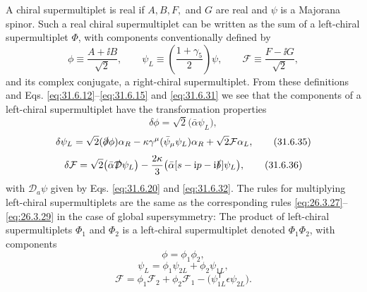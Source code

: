 A chiral supermultiplet is real if \(A,B,F,\) and \(G\) are real and
\(\psi\) is a Majorana spinor. Such a real chiral supermultiplet can be
written as the sum of a left-chiral supermultiplet \(\Phi\), with
components conventionally defined by
\begin{equation}
  \phi\equiv\frac{A+\ii B}{\sqrt{2}},\qquad
  \psi_L\equiv\left(\frac{1+\gamma_5}{2}\right)\psi,\qquad
  \mathcal F\equiv\frac{F-\ii G}{\sqrt{2}},
  \tag{31.6.33}\label{eq:31.6.33}
\end{equation}
and its complex conjugate, a right-chiral supermultiplet. From these
definitions and Eqs. \eqref{eq:31.6.12}--\eqref{eq:31.6.15} and
\eqref{eq:31.6.31} we see that the components of a left-chiral
supermultiplet have the transformation properties
\begin{equation}
  \delta\phi=\sqrt{2}\bigl(\bar\alpha\psi_L\bigr),
  \tag{31.6.34}\label{eq:31.6.34}
\end{equation}
\begin{equation}
  \delta\psi_L
  =\sqrt{2}(\sl{\partial}\phi)\alpha_R
   -\kappa\gamma^\mu(\bar\psi_\mu\psi_L)\alpha_R
   +\sqrt{2}\mathcal F\alpha_L,
  \tag{31.6.35}\label{eq:31.6.35}
\end{equation}
\begin{equation}
  \delta\mathcal F
  =\sqrt{2}\bigl(\bar\alpha\sl{\mathcal D}\psi_L\bigr)
   -\frac{2\kappa}{3}
    \bigl(\bar\alpha[s-\ii p-\ii\sl{b}]\psi_L\bigr),
  \tag{31.6.36}\label{eq:31.6.36}
\end{equation}
with \(\mathcal D_a\psi\) given by Eqs. \eqref{eq:31.6.20} and
\eqref{eq:31.6.32}. The rules for multiplying left-chiral
supermultiplets are the same as the corresponding rules
\eqref{eq:26.3.27}--\eqref{eq:26.3.29} in the case of global
supersymmetry: The product of left-chiral supermultiplets \(\Phi_1\)
and \(\Phi_2\) is a left-chiral supermultiplet denoted
\(\Phi_1\Phi_2\), with components
\begin{equation}
  \phi=\phi_1\phi_2,
  \tag{31.6.37}\label{eq:31.6.37}
\end{equation}
\begin{equation}
  \psi_L=\phi_1\psi_{2L}+\phi_2\psi_{1L},
  \tag{31.6.38}\label{eq:31.6.38}
\end{equation}
\begin{equation}
  \mathcal F
  =\phi_1\mathcal F_2+\phi_2\mathcal F_1
   -\bigl(\psi_{1L}^{\mathsf T}\epsilon\psi_{2L}\bigr).
  \tag{31.6.39}\label{eq:31.6.39}
\end{equation}

